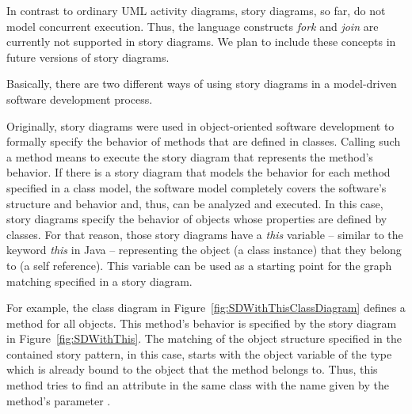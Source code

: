 In contrast to ordinary UML activity diagrams, story diagrams, so far, do not model concurrent execution.
Thus, the language constructs \emph{fork} and \emph{join} are currently not supported in story diagrams.
We plan to include these concepts in future versions of story diagrams.


Basically, there are two different ways of using story diagrams in a model-driven software development process.

Originally, story diagrams were used in object-oriented software development to formally specify the behavior of methods that are defined in classes.
Calling such a method means to execute the story diagram that represents the method's behavior.
If there is a story diagram that models the behavior for each method specified in a class model,
the software model completely covers the software's structure and behavior and, thus, can be analyzed and executed.
In this case, story diagrams specify the behavior of objects whose properties are defined by classes.
For that reason, those story diagrams have a \emph{this} variable -- similar to the keyword \emph{this} in Java -- representing the object (a class instance) that they belong to (a self reference).
This variable can be used as a starting point for the graph matching specified in a story diagram.

For example, the class diagram in Figure~\ref{fig:SDWithThisClassDiagram} defines a method  for all  objects.
This method's behavior is specified by the story diagram in Figure~\ref{fig:SDWithThis}.
The matching of the object structure specified in the contained story pattern, in this case,
starts with the  object variable of the type  which is already bound
to the  object that the  method belongs to.
Thus, this method tries to find an attribute  in the same class with the name given by the method's parameter .

